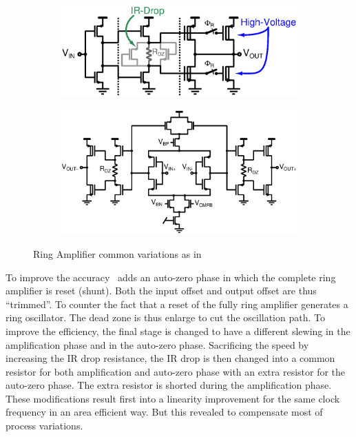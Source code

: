 \begin{figure}[htp]
	\centering
    \begin{subfigure}[b]{0.5\textwidth}
        \includegraphics[width=\textwidth]{ring_amplifier_variations.ps}
        \label{fig:ring_amp_variation}
	\end{subfigure}
	\begin{subfigure}[b]{0.48\textwidth}
        \includegraphics[width=\textwidth]{fully_diff_ring_amp.ps}
        \label{fig:ring_amp_fd}
    \end{subfigure}
	\caption[Ring Amplifier common variations]{Ring Amplifier common variations as in~\cite{YLim2015,YLim2015FD,YCao2017}}
	\label{fig:algo_ring_amp}
\end{figure}

To improve the accuracy~\cite{Megawer2016} adds an auto-zero phase in which the complete ring amplifier is reset (shunt). Both the input offset and output offset are thus ``trimmed''. To counter the fact that a reset of the fully ring amplifier generates a ring oscillator. The dead zone is thus enlarge to cut the oscillation path. To improve the efficiency, the final stage is changed to have a different slewing in the amplification phase and in the auto-zero phase. Sacrificing the speed by increasing the IR drop resistance, the IR drop is then changed into a common resistor for both amplification and auto-zero phase with an extra resistor for the auto-zero phase. The extra resistor is shorted during the amplification phase. These modifications result first into a linearity improvement for the same clock frequency in an area efficient way. But this revealed to compensate most of process variations.


